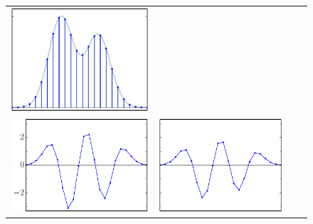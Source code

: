 \documentclass[11pt,preprint]{aastex}
\begin{document}
\begin{figure}
\begin{center}
\begin{tabular}{@{}c@{}c@{}c@{}c@{}}
\includegraphics[height=\figh]{plots3/boxes-03} \\
%
\includegraphics[height=\figh]{plots3/boxes-04} &
\includegraphics[height=\figh]{plots3/boxes-05} &

\end{tabular}
\end{center}
\end{figure}
\end{document}
